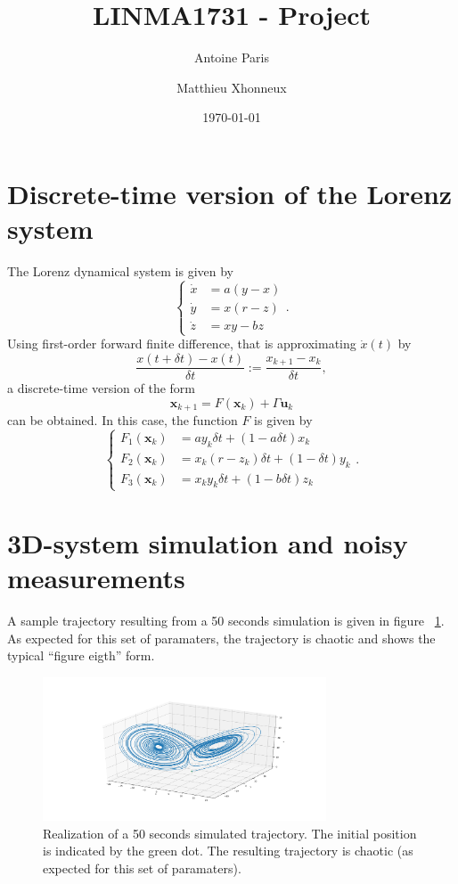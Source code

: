 \documentclass[english, DIV=13]{scrartcl}
\title{LINMA1731 - Project}
\author{Antoine Paris\and Matthieu Xhonneux}
\date{\today}
\renewcommand{\vec}[1]{\mathbf{#1}}
\begin{document}
\maketitle

\section{Discrete-time version of the Lorenz system}
The Lorenz dynamical system is given by
\begin{equation*}
    \begin{cases}
        \dot{x} &= a(y-x) \\
        \dot{y} &= x(r-z) \\
        \dot{z} &= xy - bz
    \end{cases}.
\end{equation*}
Using first-order forward finite difference, that is approximating $\dot{x}(t)$ by
\[ \frac{x(t+\delta t) - x(t)}{\delta t} := \frac{x_{k+1} - x_k}{\delta t}, \]
a discrete-time version of the form
\[ \vec{x}_{k+1} = F(\vec{x}_k) + \Gamma\vec{u}_k \]
can be obtained. In this case, the function $F$ is given by
\begin{equation*}
    \begin{cases}
        F_1(\vec{x}_k) &= ay_k\delta t + (1-a\delta t)x_k \\
        F_2(\vec{x}_k) &= x_k(r-z_k)\delta t + (1-\delta t)y_k \\
        F_3(\vec{x}_k) &= x_ky_k\delta t + (1-b\delta t)z_k
    \end{cases}.
\end{equation*}

\section{3D-system simulation and noisy measurements}
A sample trajectory resulting from a 50 seconds simulation is given in figure~
\ref{fig:q2-3d-trajectory}. As expected for this set of paramaters, the trajectory
is chaotic and shows the typical ``figure eigth'' form. 

\begin{figure}[ht!]
    \centering
    \includegraphics[width=0.75\textwidth]{figures/q2-3d-trajectory}
    \caption{Realization of a 50 seconds simulated trajectory. The initial
    position is indicated by the green dot. The resulting trajectory is chaotic
    (as expected for this set of paramaters).}
    \label{fig:q2-3d-trajectory}
\end{figure}
\end{document}
